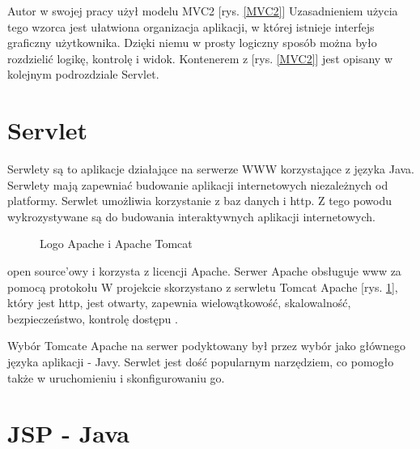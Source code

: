 \documentclass[eng,printmode,oneside]{mgr}
\begin{document}
Autor w swojej pracy użył modelu MVC2 [rys. \ref{MVC2}]
Uzasadnieniem użycia tego wzorca jest ułatwiona organizacja aplikacji, w której
istnieje interfejs graficzny użytkownika. Dzięki niemu w prosty logiczny sposób
można było rozdzielić logikę, kontrolę i widok. Kontenerem z [rys. \ref{MVC2}]
jest opisany w kolejnym podrozdziale Servlet.

\section{Servlet}

Serwlety są to aplikacje działające na serwerze WWW korzystające z języka Java.
Serwlety mają zapewniać budowanie aplikacji internetowych niezależnych od
platformy. Serwlet umożliwia korzystanie z baz danych i http. Z tego powodu
wykrozystywane są do budowania interaktywnych aplikacji internetowych. 
\begin{figure}
\label{apache}
\centering
\captionsetup{justification=centering,margin=1cm}
\vspace{-20pt}
\begin{center}
\end{center}
\vspace{-20pt}
\caption{Logo Apache i Apache Tomcat \cite{apache.org}}
\vspace{-10pt}
\end{figure}

open source'owy i korzysta z licencji Apache. Serwer Apache obsługuje www za pomocą protokołu
W projekcie skorzystano z serwletu Tomcat Apache [rys. \ref{apache}], który jest
http, jest otwarty, zapewnia wielowątkowość, skalowalność, bezpieczeństwo,
kontrolę dostępu \cite{apache.wiki}. 


Wybór Tomcate Apache na serwer podyktowany był przez wybór jako głównego języka
aplikacji - Javy. Serwlet jest dość popularnym narzędziem, co pomogło także w
uruchomieniu i skonfigurowaniu go.
\section{JSP - Java}
\end{document}
